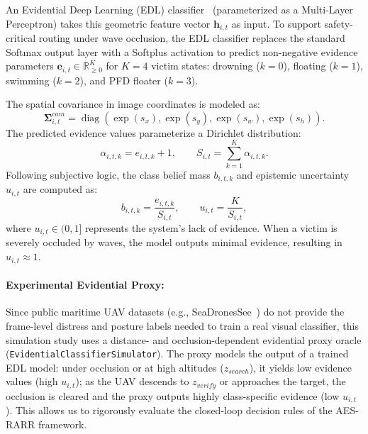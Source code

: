 \documentclass[runningheads]{llncs}
\newcommand{\operatorname}[1]{\mathop{\mathrm{#1}}}
\newcommand{\aes}{AES-RARR}
\begin{document}
An Evidential Deep Learning (EDL) classifier~\cite{sensoy2018edl} (parameterized as a Multi-Layer Perceptron) takes this geometric feature vector $\mathbf{h}_{i,t}$ as input. To support safety-critical routing under wave occlusion, the EDL classifier replaces the standard Softmax output layer with a Softplus activation to predict non-negative evidence parameters $\mathbf{e}_{i,t} \in \mathbb{R}^{K}_{\geq 0}$ for $K=4$ victim states: drowning ($k=0$), floating ($k=1$), swimming ($k=2$), and PFD floater ($k=3$).

The spatial covariance in image coordinates is modeled as:
\begin{equation}
  \boldsymbol{\Sigma}^{cam}_{i,t} =
  \operatorname{diag}\!\left(\exp(s_x),\exp(s_y),\exp(s_w),\exp(s_h)\right).
\end{equation}
The predicted evidence values parameterize a Dirichlet distribution:
\begin{equation}
  \alpha_{i,t,k}=e_{i,t,k}+1, \qquad
  S_{i,t}=\sum_{k=1}^{K}\alpha_{i,t,k}.
\end{equation}
Following subjective logic, the class belief mass $b_{i,t,k}$ and epistemic uncertainty $u_{i,t}$ are computed as:
\begin{equation}
  b_{i,t,k}=\frac{e_{i,t,k}}{S_{i,t}}, \qquad
  u_{i,t}=\frac{K}{S_{i,t}},
  \label{eq:edl}
\end{equation}
where $u_{i,t} \in (0, 1]$ represents the system's lack of evidence. When a victim is severely occluded by waves, the model outputs minimal evidence, resulting in $u_{i,t} \approx 1$.

\paragraph{Experimental Evidential Proxy:}
Since public maritime UAV datasets (e.g., SeaDronesSee~\cite{varga2022seadronessee}) do not provide the frame-level distress and posture labels needed to train a real visual classifier, this simulation study uses a distance- and occlusion-dependent evidential proxy oracle (\texttt{EvidentialClassifierSimulator}). The proxy models the output of a trained EDL model: under occlusion or at high altitudes ($z_{search}$), it yields low evidence values (high $u_{i,t}$); as the UAV descends to $z_{verify}$ or approaches the target, the occlusion is cleared and the proxy outputs highly class-specific evidence (low $u_{i,t}$). This allows us to rigorously evaluate the closed-loop decision rules of the \aes{} framework.
\end{document}
